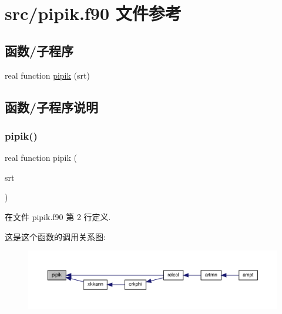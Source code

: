 \hypertarget{pipik_8f90}{}\section{src/pipik.f90 文件参考}
\label{pipik_8f90}
\subsection*{函数/子程序}
\begin{DoxyCompactItemize}
\item 
real function \mbox{\hyperlink{pipik_8f90_a146c8bc5a38e9c2f1799a5589775d19b}{pipik}} (srt)
\end{DoxyCompactItemize}


\subsection{函数/子程序说明}
\mbox{\label{pipik_8f90_a146c8bc5a38e9c2f1799a5589775d19b}} 
\subsubsection{\texorpdfstring{pipik()}{pipik()}}
{\footnotesize\ttfamily real function pipik (\begin{DoxyParamCaption}\item[{}]{srt }\end{DoxyParamCaption})}



在文件 pipik.\+f90 第 2 行定义.

这是这个函数的调用关系图\+:
\nopagebreak
\begin{figure}[H]
\begin{center}
\leavevmode
\includegraphics[width=350pt]{pipik_8f90_a146c8bc5a38e9c2f1799a5589775d19b_icgraph}
\end{center}
\end{figure}
